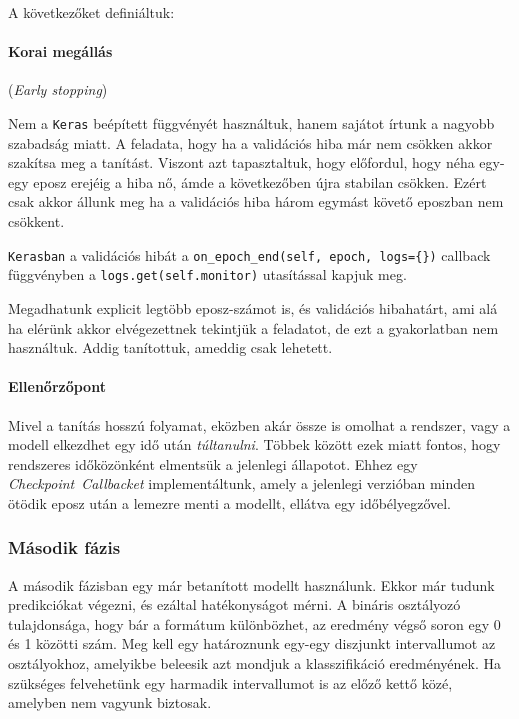 \noindent
A következőket definiáltuk:

\paragraph{Korai megállás} (\textit{Early stopping})

Nem a \texttt{Keras} beépített függvényét használtuk, hanem sajátot írtunk a
nagyobb szabadság miatt. A feladata, hogy ha a validációs hiba már nem csökken akkor 
szakítsa meg a tanítást. Viszont azt tapasztaltuk, hogy előfordul, hogy néha
egy-egy eposz erejéig a hiba nő, ámde a következőben újra stabilan csökken.
Ezért csak akkor állunk meg ha a validációs hiba három egymást követő eposzban
nem csökkent.

\texttt{Kerasban} a validációs hibát a \texttt{on\_epoch\_end(self, epoch, logs=\{\})} 
callback függvényben a \texttt{logs.get(self.monitor)} utasítással kapjuk meg.

Megadhatunk explicit legtöbb eposz-számot is, és validációs hibahatárt, ami alá ha
elérünk akkor elvégezettnek tekintjük a feladatot, de ezt a gyakorlatban nem használtuk.
Addig tanítottuk, ameddig csak lehetett.

\paragraph{Ellenőrzőpont}

Mivel a tanítás hosszú folyamat, eközben akár össze is omolhat a rendszer, vagy
a modell elkezdhet egy idő után \textit{túltanulni}. Többek között ezek miatt fontos,
hogy rendszeres időközönként elmentsük a jelenlegi állapotot. Ehhez egy 
\textit{Checkpoint~Callbacket} implementáltunk, amely a jelenlegi verzióban minden ötödik
eposz után a lemezre menti a modellt, ellátva egy időbélyegzővel.



\subsubsection{Második fázis}
\label{sec:masodik.fazis}

A második fázisban egy már betanított modellt használunk. Ekkor már tudunk predikciókat 
végezni, és ezáltal hatékonyságot mérni. A bináris osztályozó tulajdonsága, hogy bár
a formátum különbözhet, az eredmény végső soron egy 0 és 1 közötti szám. Meg kell egy határoznunk egy-egy diszjunkt intervallumot az osztályokhoz, amelyikbe beleesik azt mondjuk
a klasszifikáció eredményének. Ha szükséges felvehetünk egy harmadik intervallumot is 
az előző kettő közé, amelyben nem vagyunk biztosak.


